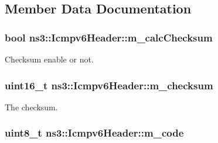 \subsection{Member Data Documentation}
\subsubsection[{\texorpdfstring{m\+\_\+calc\+Checksum}{m_calcChecksum}}]{\setlength{\rightskip}{0pt plus 5cm}bool ns3\+::\+Icmpv6\+Header\+::m\+\_\+calc\+Checksum\hspace{0.3cm}{\ttfamily [protected]}}\hypertarget{classns3_1_1Icmpv6Header_afdfd2dc6e28e0504e02c741d9585ccf9}{}\label{classns3_1_1Icmpv6Header_afdfd2dc6e28e0504e02c741d9585ccf9}


Checksum enable or not. 

\subsubsection[{\texorpdfstring{m\+\_\+checksum}{m_checksum}}]{\setlength{\rightskip}{0pt plus 5cm}uint16\+\_\+t ns3\+::\+Icmpv6\+Header\+::m\+\_\+checksum\hspace{0.3cm}{\ttfamily [protected]}}\hypertarget{classns3_1_1Icmpv6Header_a6fe65b5998d91492bf6c1e13c8a0f29c}{}\label{classns3_1_1Icmpv6Header_a6fe65b5998d91492bf6c1e13c8a0f29c}


The checksum. 

\subsubsection[{\texorpdfstring{m\+\_\+code}{m_code}}]{\setlength{\rightskip}{0pt plus 5cm}uint8\+\_\+t ns3\+::\+Icmpv6\+Header\+::m\+\_\+code\hspace{0.3cm}{\ttfamily [private]}}\hypertarget{classns3_1_1Icmpv6Header_a4f0268e1df07589e9fb7da198592fdf9}{}\label{classns3_1_1Icmpv6Header_a4f0268e1df07589e9fb7da198592fdf9}


